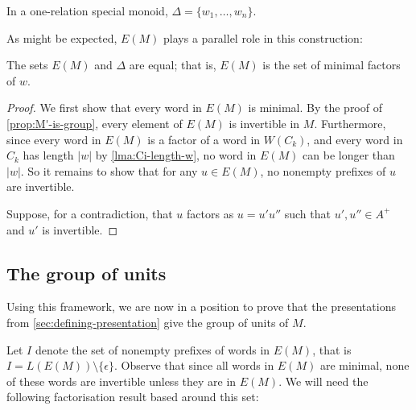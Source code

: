 \documentclass[noindex,noinsetproof,12pt]{lmaths}
\let\incomplete\relax
\begin{document}
\begin{lemma}
	In a one-relation special monoid, $\Delta = \{w_1, \ldots, w_n\}$. \incomplete
\end{lemma}

As might be expected, $E(M)$ plays a parallel role in this construction:

\begin{prop}
	The sets $E(M)$ and $\Delta$ are equal; that is, $E(M)$ is the set of minimal factors of $w$. \incomplete
\end{prop}
\begin{proof}
	We first show that every word in $E(M)$ is minimal. By the proof of \cref{prop:M'-is-group}, every element of $E(M)$ is invertible in $M$. Furthermore, since every word in $E(M)$ is a factor of a word in $W(C_k)$, and every word in $C_k$ has length $|w|$ by \cref{lma:Ci-length-w}, no word in $E(M)$ can be longer than $|w|$. So it remains to show that for any $u \in E(M)$, no nonempty prefixes of $u$ are invertible.

	Suppose, for a contradiction, that $u$ factors as $u = u'u''$ such that $u', u'' \in A^+$ and $u'$ is invertible.
\end{proof}


\subsection{The group of units} \label{sec:group-of-units}

Using this framework, we are now in a position to prove that the presentations from \cref{sec:defining-presentation} give the group of units of $M$.

Let $I$ denote the set of nonempty prefixes of words in $E(M)$, that is $I = L(E(M)) \setminus \{\epsilon\}$. Observe that since all words in $E(M)$ are minimal, none of these words are invertible unless they are in $E(M)$. We will need the following factorisation result based around this set:
\end{document}
